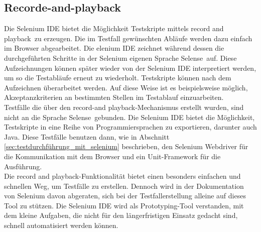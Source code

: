 \subsection{Recorde-and-playback}
\label{sec:recorde_and_playback}
Die Selenium IDE bietet die Möglichkeit Testskripte mittels \grq record and playback\grq\ zu erzeugen.
Die im Testfall gewünschten Abläufe werden dazu einfach im Browser abgearbeitet.
Die elenium IDE zeichnet während dessen die durchgeführten Schritte in der Selenium eigenen Sprache \grq Selense\grq\ auf. Diese Aufzeichnungen können später wieder von der Selenium IDE interpretiert werden, um so die Testabläufe erneut zu wiederholt.
Testskripte können nach dem Aufzeichnen überarbeitet werden. Auf diese Weise ist es beispielsweise möglich, Akzeptanzkriterien an bestimmten Stellen im Testablauf einzuarbeiten.\\
Testfälle die über den \grq record-and playback\grq -Mechanismus erstellt wurden, sind nicht an die Sprache \grq Selense\grq\ gebunden. Die Selenium IDE bietet die Möglichkeit, Testskripte in eine Reihe von Programmiersprachen zu exportieren, darunter auch Java.
Diese Testfälle benutzen dann, wie in Abschnitt \ref{sec:testdurchführung_mit_selenium} beschrieben, den Selenium Webdriver für die Kommunikation mit dem Browser und ein Unit-Framework für die Ausführung.\\
Die \grq record and playback\grq -Funktionalität bietet einen besonders einfachen und schnellen Weg, um Testfälle zu erstellen. Dennoch wird in der Dokumentation von Selenium \cite{selenium_selenium_2015-1} davon abgeraten, sich bei der Testfallerstellung alleine auf dieses Tool zu stützen. Die Selenium IDE wird als Prototyping-Tool verstanden, mit dem kleine Aufgaben, die nicht für den längerfristigen Einsatz gedacht sind, schnell automatisiert werden können.

